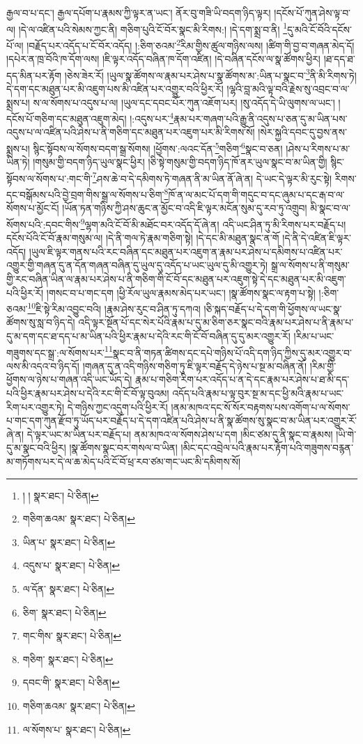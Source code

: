 རྒྱལ་བ་པ་དང་། རྒྱལ་དཔོག་པ་རྣམས་ཀྱི་ལྟར་ན་ཡང་། ནོར་བུ་གཟི་ཡི་བདག་ཉིད་ལྟར། །དངོས་པོ་ཀུན་ཤེས་ལྟ་བ་ལ། །དེ་ལ་འཛིན་པའི་སེམས་ཀྱང་ནི། གཅིག་པུའི་ངོ་བོར་སྣང་མི་རིགས:། །དེ་དག་སྨྲ་བ་ནི། \footnote{། །   སྣར་ཐང་།  པེ་ཅིན། }དུ་མའི་ངོ་བོའི་དངོས་པོ་ལ། །བརྗོད་པར་འདོད་པ་ངོ་བོར་འདོད། །:ཅིག་ཅའམ་\footnote{གཅིག་ཆའམ་  སྣར་ཐང་།  པེ་ཅིན། }རིམ་གྱིས་ཚུལ་གཉིས་ལས། །ཚིག་གི་བྱ་བ་གཞན་མེད་དོ། །དཔེར་ན་ཁྲ་བོའི་ཁ་དོག་ལས། །ཇི་ལྟར་འདོད་བཞིན་ཁ་དོག་འཛིན། །དེ་བཞིན་དངོས་ལ་སྣ་ཚོགས་ཕྱིར། །ཐ་དད་ཐ་དད་མིན་པར་རྟོག །ཅེས་ཟེར་རོ། །ཡུལ་སྣ་ཚོགས་ལ་རྣམ་པར་ཤེས་པ་སྣ་ཚོགས་མ་:ཡིན་པ་སྣང་བ་\footnote{ཡིན་པ་  སྣར་ཐང་།  པེ་ཅིན། }ནི་མི་རིགས་ཏེ། དེ་དག་དང་མཐུན་པར་མི་འཇུག་པས་མི་འཛིན་པར་འགྱུར་བའི་ཕྱིར་རོ། །ལྷའི་བླ་མའི་ལྟ་བའི་རྗེས་སུ་འབྲང་བ་ལ་སྨྲས་པ། ས་ལ་སོགས་པ་འདུས་པ་ལ། །ཡུལ་དང་དབང་པོར་ཀུན་འཇོག་པར། །སུ་འདོད་དེ་ཡི་ལུགས་ལ་ཡང་། །དངོས་པོ་གཅིག་དང་མཐུན་འཇུག་མེད། །:འདུས་པར་\footnote{འདུས་པ་  སྣར་ཐང་།  པེ་ཅིན། }རྣམ་པར་གཞག་པའི་རྒྱུ་ནི་འདུས་པ་ཅན་དུ་མ་ཡིན་པས་འདུས་པ་ལ་འཛིན་པའི་ཤེས་པ་ནི་གཅིག་དང་མཐུན་པར་འཇུག་པར་མི་རིགས་སོ། །སེར་སྐྱའི་དབང་དུ་བྱས་ནས་སྨྲས་པ། སྙིང་སྟོབས་ལ་སོགས་བདག་སྒྲ་སོགས། །ཕྱོགས་:ལའང་དོན་\footnote{ལ་དོན་  སྣར་ཐང་།  པེ་ཅིན། }གཅིག་\footnote{ཅིག་  སྣར་ཐང་།  པེ་ཅིན། }སྣང་བ་ཅན། །ཤེས་པ་རིགས་པ་མ་ཡིན་ཏེ། །གསུམ་གྱི་བདག་ཉིད་ཡུལ་སྣང་ཕྱིར། །ཅི་སྟེ་གསུམ་གྱི་བདག་ཉིད་ཁོ་ནར་ཡུལ་སྣང་བ་མ་ཡིན་གྱི། སྙིང་སྟོབས་ལ་སོགས་པ་:གང་གི་\footnote{གང་གིས་  སྣར་ཐང་།  པེ་ཅིན། }ཤས་ཆེ་བ་དེ་དམིགས་ཏེ་གཞན་ནི་མ་ཡིན་ནོ་ཞེ་ན། དེ་ཡང་དེ་ལྟར་མི་རུང་སྟེ། རིགས་དང་བསྒོམས་པའི་བྱེ་བྲག་གིས་སྒྲ་ལ་སོགས་པ་ཅིག་\footnote{གཅིག་  སྣར་ཐང་།  པེ་ཅིན། }ཁོ་ན་ལ་མང་པོ་དག་གི་གདུང་བ་དང་ཞུམ་པ་དང་རྒ་བ་ལ་སོགས་པ་མྱོང་ངོ། །ཡོན་ཏན་གཉིས་ཀྱི་ཤས་ཆུང་ན་མྱོང་བ་འདི་ཇི་ལྟར་མངོན་སུམ་དུ་རབ་ཏུ་འགྲུབ། མི་སྣང་བ་ལ་སོགས་པའི་:དབང་གིས་\footnote{དབང་གི་  སྣར་ཐང་།  པེ་ཅིན། }ལྷག་མའི་ངོ་བོ་མི་མཐོང་བར་འདོད་དོ་ཞེ་ན། འདི་ཡང་ཤིན་ཏུ་མི་རིགས་པར་བརྗོད་པ། དངོས་པོའི་ངོ་བོ་རྣམ་གསུམ་ལ། །དེ་ནི་གལ་ཏེ་རྣམ་གཅིག་སྟེ། །དེ་དང་མི་མཐུན་སྣང་ན་གོ །དེ་ནི་དེ་འཛིན་ཇི་ལྟར་འདོད། །ཡུལ་ཇི་ལྟར་གནས་པའི་རང་བཞིན་དང་མཐུན་པར་འཇུག་ན་རྣམ་པར་ཤེས་པ་དམིགས་པ་འཛིན་པར་འགྱུར་གྱི་གཞན་དུ་ན་དོན་གཞན་བཞིན་དུ་ཡུལ་དུ་འདོད་པ་ཡང་ཡུལ་དུ་མི་འགྱུར་ཏེ། སྒྲ་ལ་སོགས་པ་ནི་གསུམ་གྱི་རང་བཞིན་ཡིན་ལ་རྣམ་པར་ཤེས་པ་ནི་གཅིག་གི་ངོ་བོ་དང་མཐུན་པར་འཇུག་སྟེ་དེ་དང་མཐུན་པར་མི་འཇུག་པའི་ཕྱིར་རོ། །གསང་བ་པ་གང་དག །ཕྱི་རོལ་ཡུལ་རྣམས་མེད་པར་ཡང་། །སྣ་ཚོགས་སྣང་ལ་རྟག་པ་སྟེ། །:ཅིག་ཅའམ་\footnote{གཅིག་ཆའམ་  སྣར་ཐང་།  པེ་ཅིན། }ཇི་སྟེ་རིམ་འབྱུང་བའི། །རྣམ་ཤེས་རུང་བ་ཤིན་ཏུ་དཀའ། །ཅི་སྐད་བརྗོད་པ་དེ་དག་གི་ཕྱོགས་ལ་ཡང་སྣ་ཚོགས་སུ་སླ་བ་ཉིད་དེ། འདི་ལྟར་སྔོན་པོ་དང་སེར་པོའི་རྣམ་པ་དུ་མ་ཅིག་ཅར་སྣང་བའི་རྣམ་པར་ཤེས་པ་ནི་རྣམ་པ་དུ་མ་དག་དང་ཐ་དད་པ་མ་ཡིན་པའི་ཕྱིར་རྣམ་པ་དེའི་རང་གི་ངོ་བོ་བཞིན་དུ་དུ་མར་འགྱུར་རོ། །རིམ་པ་ཡང་གཟུགས་དང་སྒྲ་:ལ་སོགས་པར་\footnote{ལ་སོགས་པ་  སྣར་ཐང་།  པེ་ཅིན། }སྣང་བ་ནི་གཏན་ཚིགས་དང་དཔེ་གཉིས་པོ་འདི་དག་ཉིད་ཀྱིས་དུ་མར་འགྱུར་བ་ལས་མི་འདའ་བ་ཉིད་དོ། །གཞན་དུ་ན་འདི་གཉིས་གཅིག་ཏུ་ཇི་ལྟར་བརྗོད་དེ་ཉེས་པ་སྔ་མ་བཞིན་ནོ། །རིམ་གྱི་ཕྱོགས་ལ་ཉེས་པ་གཞན་འདི་ཡང་ཡོད་དེ། རྣམ་པ་གཅིག་རིག་པར་འདོད་པ་ན་དེ་དང་རྣམ་པར་ཤེས་པ་ཐ་མི་དད་པའི་ཕྱིར་རྣམ་པར་ཤེས་པ་དེའི་རང་གི་ངོ་བོ་ལྟ་བུའམ། འདོད་པའི་རྣམ་པ་ལྟ་བུར་སྔ་མ་དང་ཕྱི་མའི་རྣམ་པ་ཡང་རིག་པར་འགྱུར་ཏེ། དེ་གཉིས་ཀྱང་འདུག་པའི་ཕྱིར་རོ། །ནམ་མཁའ་དང་སོ་སོར་བརྟགས་པས་འགོག་པ་ལ་སོགས་པ་གང་དག་ཀུན་རྫོབ་ཏུ་ཡོད་པར་བརྗོད་པ་དེ་དག་འཛིན་པའི་ཤེས་པ་ནི་སྣ་ཚོགས་སུ་སྣང་བ་མ་ཡིན་པར་འགྱུར་རོ་ཞེ་ན། དེ་ལྟར་ཡང་མ་ཡིན་པར་བརྗོད་པ། ནམ་མཁའ་ལ་སོགས་ཤེས་པ་དག །མིང་ཙམ་དུ་ནི་སྣང་བ་རྣམས། །ཡི་གེ་དུ་མ་སྣང་བའི་ཕྱིར། །སྣ་ཚོགས་སྣང་བར་གསལ་བ་ཡིན། །མིང་དང་འབྲེལ་པའི་རྣམ་པར་རྟོག་པའི་གཟུགས་བརྙན་མ་གཏོགས་པར་དེ་ལ་ཆ་མེད་པའི་ངོ་བོ་ཕྲ་རབ་ཙམ་གང་ཡང་མི་དམིགས་སོ། 